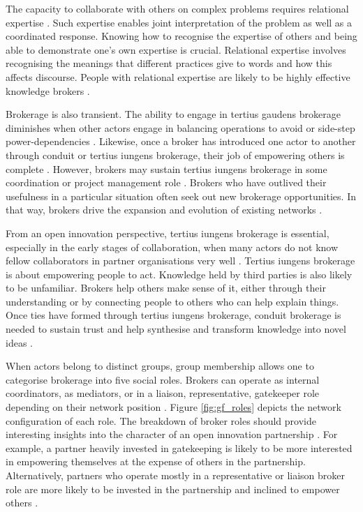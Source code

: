 The capacity to collaborate with others on complex problems requires relational expertise \citep{edwards2017working}. Such expertise enables joint interpretation of the problem as well as a coordinated response. Knowing how to recognise the expertise of others and being able to demonstrate one's own expertise is crucial. Relational expertise involves recognising the meanings that different practices give to words and how this affects discourse. People with relational expertise are likely to be highly effective knowledge brokers \citep{grigoriou2014structural, edwards2017working}. \medskip

Brokerage is also transient. The ability to engage in tertius gaudens brokerage diminishes when other actors engage in balancing operations to avoid or side-step power-dependencies \citep{emerson1962power,quintane2021temporal}. Likewise, once a broker has introduced one actor to another through conduit or tertius iungens brokerage, their job of empowering others is complete \citep{obstfeld2014brokerage}. However, brokers may sustain tertius iungens brokerage in some coordination or project management role \citep{grosser2019measuring}. Brokers who have outlived their usefulness in a particular situation often seek out new brokerage opportunities. In that way, brokers drive the expansion and evolution of existing networks \citep{obstfeld2014brokerage,quintane2016brokers,quintane2021temporal}. \medskip

From an open innovation perspective, tertius iungens brokerage is essential, especially in the early stages of collaboration, when many actors do not know fellow collaborators in partner organisations very well \citep{fleming2007collaborative}. Tertius iungens brokerage is about empowering people to act. Knowledge held by third parties is also likely to be unfamiliar. Brokers help others make sense of it, either through their understanding or by connecting people to others who can help explain things. Once ties have formed through tertius iungens brokerage, conduit brokerage is needed to sustain trust and help synthesise and transform knowledge into novel ideas \citep{quintane2016brokers,grosser2019measuring}. \medskip

When actors belong to distinct groups, group membership allows one to categorise brokerage into five social roles. Brokers can operate as internal coordinators, as mediators, or in a liaison, representative, gatekeeper role depending on their network position \citep{gould1989structures}. Figure \ref{fig:gf_roles} depicts the network configuration of each role. The breakdown of broker roles should provide interesting insights into the character of an open innovation partnership \citep{spiro2013extended}. For example, a partner heavily invested in gatekeeping is likely to be more interested in empowering themselves at the expense of others in the partnership. Alternatively, partners who operate mostly in a representative or liaison broker role are more likely to be invested in the partnership and inclined to empower others \citep{spiro2013extended}. \medskip

